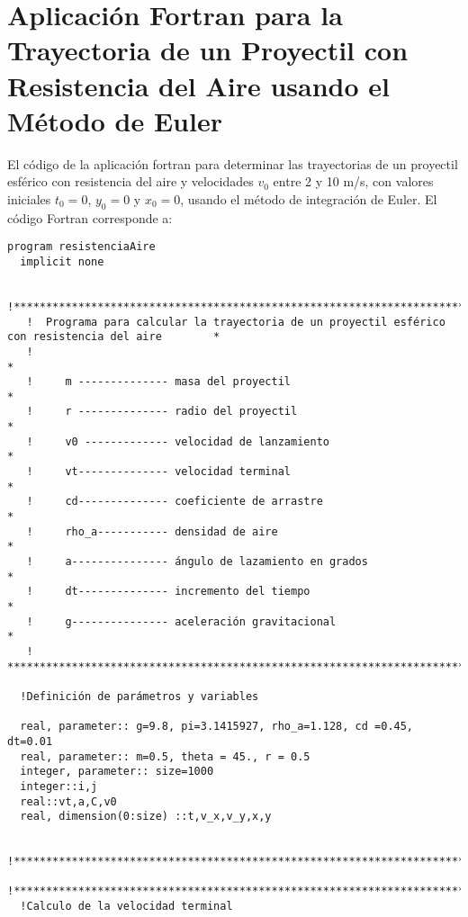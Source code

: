 \documentclass[12pt,a4paper,twoside]{article}
\begin{document}
\section{Aplicación Fortran para la Trayectoria de un Proyectil con Resistencia del Aire usando el Método de Euler}
El código de la aplicación fortran para determinar las trayectorias de un proyectil esférico con resistencia del aire y velocidades $v_{0}$ entre 2 y 10 m/s, con valores iniciales $t_{0}=0$, $y_{0}=0$ y $x_{0}=0$, usando el método de integración de Euler.
El código Fortran corresponde a:
\begin{verbatim}
program resistenciaAire
  implicit none

   !**************************************************************************************************
   !  Programa para calcular la trayectoria de un proyectil esférico con resistencia del aire        *
   !                                                                                                 *
   !     m -------------- masa del proyectil                                                         *
   !     r -------------- radio del proyectil                                                        *
   !     v0 ------------- velocidad de lanzamiento                                                   *
   !     vt-------------- velocidad terminal                                                         *
   !     cd-------------- coeficiente de arrastre                                                    *
   !     rho_a----------- densidad de aire                                                           *
   !     a--------------- ángulo de lazamiento en grados                                             *
   !     dt-------------- incremento del tiempo                                                      *
   !     g--------------- aceleración gravitacional                                                  *
   ! *************************************************************************************************
   
  !Definición de parámetros y variables
  
  real, parameter:: g=9.8, pi=3.1415927, rho_a=1.128, cd =0.45, dt=0.01
  real, parameter:: m=0.5, theta = 45., r = 0.5
  integer, parameter:: size=1000
  integer::i,j
  real::vt,a,C,v0
  real, dimension(0:size) ::t,v_x,v_y,x,y
  
  !**************************************************************************************************
  !**************************************************************************************************
  !Calculo de la velocidad terminal
  

\end{verbatim}
\end{document}
